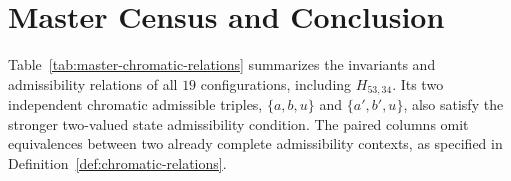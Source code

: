 \documentclass[aps,pra,reprint,superscriptaddress,longbibliography,nofootinbib,floatfix,10pt]{revtex4-2}
\theoremstyle{definition}\newtheorem{definition}[theorem]{Definition}
\theoremstyle{remark}\newtheorem{remark}[theorem]{Remark}
\begin{document}
\section{Master Census and Conclusion}\label{sec:conclusion}

Table~\ref{tab:master-chromatic-relations} summarizes the invariants and admissibility relations of all $19$ configurations, including $H_{53,34}$. Its two independent chromatic admissible triples, $\{a,b,u\}$ and $\{a',b',u\}$, also satisfy the stronger two-valued state admissibility condition. The paired columns omit equivalences between two already complete admissibility contexts, as specified in Definition~\ref{def:chromatic-relations}.
\end{document}
